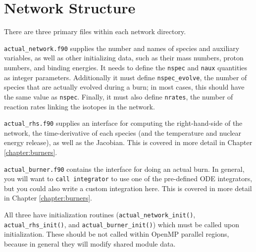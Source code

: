 \section{Network Structure}
\label{section:network_structure}

There are three primary files within each network directory.

{\tt actual\_network.f90} supplies the number and names of species and
auxiliary variables, as well as other initializing data, such as their
mass numbers, proton numbers, and binding energies. It needs to define
the {\tt nspec} and {\tt naux} quantities as integer parameters. Additionally
it must define {\tt nspec\_evolve}, the number of species that are actually evolved
during a burn; in most cases, this should have the same value as {\tt nspec}.
Finally, it must also define {\tt nrates}, the number of reaction rates
linking the isotopes in the network.

{\tt actual\_rhs.f90} supplies an interface for computing the right-hand-side
of the network, the time-derivative of each species (and the temperature and
nuclear energy release), as well as the Jacobian. This is covered in more detail
in Chapter \ref{chapter:burners}.

{\tt actual\_burner.f90} contains the interface for doing an actual burn.
In general, you will want to {\tt call integrator} to use one of the pre-defined
ODE integrators, but you could also write a custom integration here. This is
covered in more detail in Chapter \ref{chapter:burners}.

All three have initialization routines ({\tt actual\_network\_init()},
{\tt actual\_rhs\_init()}, and {\tt actual\_burner\_init()}) which must
be called upon initialization. These should be not called within
OpenMP parallel regions, because in general they will modify shared module data.

